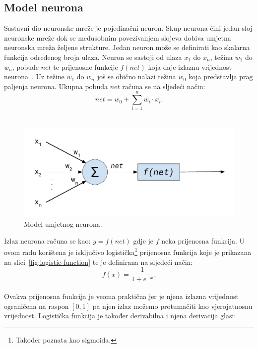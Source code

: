 \subsection{Model neurona}
\label{subsec:model-neurona}
Sastavni dio neuronske mreže je pojedinačni neuron. Skup neurona čini jedan sloj neuronske mreže dok se međusobnim
povezivanjem slojeva dobiva umjetna neuronska mreža željene strukture. Jedan neuron može se definirati kao skalarna
funkcija određenog broja ulaza. Neuron se sastoji od ulaza $x_1$ do $x_n$, težina $w_1$ do $w_n$, pobude $net$ te
prijenosne funkcije $f(net)$ koja daje izlaznu vrijednost neurona\ \citep{cupic2013}. Uz težine $w_1$ do $w_n$ još se
obično nalazi težina $w_0$ koja predstavlja prag paljenja neurona. Ukupna pobuda $net$ računa se na sljedeći način:\\
\begin{equation*}
    net = w_0 + \sum_{i = 1}^{n} w_i \cdot x_i.
\end{equation*}
\\
\begin{figure}[htb]
    \centering
    \includegraphics[width=12cm]{images/artificial-neuron-model.pdf}
    \caption{Model umjetnog neurona.}
    \label{fig:model-umjetnog-neurona}
\end{figure}
Izlaz neurona računa se kao: $y = f(net)$ gdje je $f$ neka prijenosna funkcija. U ovom radu korištena je isključivo
logistička\footnote{Također poznata kao sigmoida.} prijenosna funkcija koje je prikazana na
slici\ \ref{fig:logistic-function} te je definirana na sljedeći način:\\
\begin{equation*}
    f(x) = \frac{1}{1 + e^{-x}}.
\end{equation*}
\\
Ovakva prijenosna funkcija je veoma praktična jer je njena izlazna vrijednost ograničena na raspon $[0, 1]$ pa njen
izlaz možemo protumačiti kao vjerojatnosnu vrijednost. Logistička funkcija je također derivabilna i njena derivacija
glasi:\\
